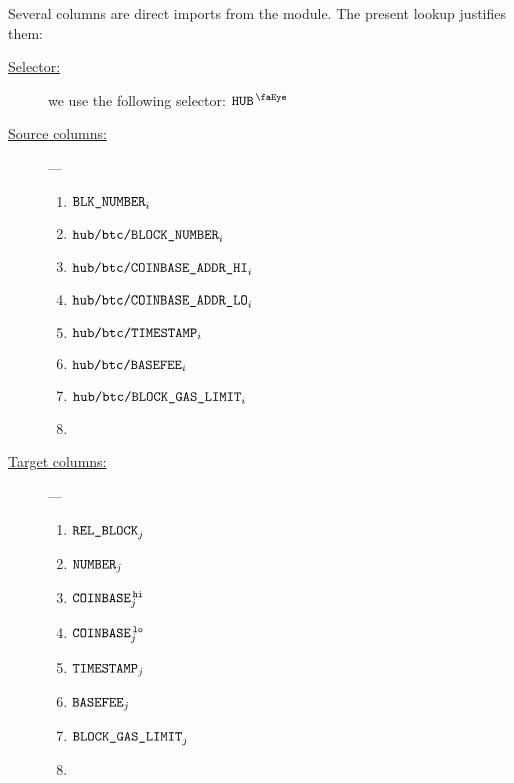 Several columns are direct imports from the \btcMod{} module.
The present lookup justifies them:
\begin{description}
	\item[\underline{Selector:}]
		we use the following selector: $\isUserTxnHubView$
	\item[\underline{Source columns:}] ---
		\begin{multicols}{2}
			\begin{enumerate}
				\item $\texttt{BLK\_NUMBER}              _{i}$
				\item $\texttt{hub}\texttt{/}{\texttt{\texttt{btc}\texttt{/}{\texttt{\texttt{BLOCK\_NUMBER}}}}}    _{i}$
				\item $\texttt{hub}\texttt{/}{\texttt{\texttt{btc}\texttt{/}{\texttt{\texttt{COINBASE\_ADDR\_HI}}}}}     _{i}$
				\item $\texttt{hub}\texttt{/}{\texttt{\texttt{btc}\texttt{/}{\texttt{\texttt{COINBASE\_ADDR\_LO}}}}}     _{i}$
				\item $\texttt{hub}\texttt{/}{\texttt{\texttt{btc}\texttt{/}{\texttt{\texttt{TIMESTAMP}}}}}      _{i}$
				\item $\texttt{hub}\texttt{/}{\texttt{\texttt{btc}\texttt{/}{\texttt{\texttt{BASEFEE}}}}}        _{i}$
				\item $\texttt{hub}\texttt{/}{\texttt{\texttt{btc}\texttt{/}{\texttt{\texttt{BLOCK\_GAS\_LIMIT}}}}}  _{i}$
				\item[\vspace{\fill}]
			\end{enumerate}
		\end{multicols}
	\item[\underline{Target columns:}] ---
		\begin{multicols}{2}
			\begin{enumerate}
				\item $\texttt{REL\_BLOCK}      _{j}$
				\item $\texttt{NUMBER}       _{j}$
				\item $\texttt{COINBASE}^{\mathtt{\,hi}} _{j}$
				\item $\texttt{COINBASE}^{\mathtt{\,lo}}  _{j}$
				\item $\texttt{TIMESTAMP}     _{j}$
				\item $\texttt{BASEFEE}       _{j}$
				\item $\texttt{BLOCK\_GAS\_LIMIT} _{j}$
				\item[\vspace{\fill}]
			\end{enumerate}
		\end{multicols}
\end{description}
